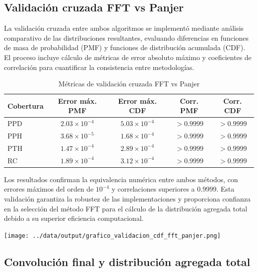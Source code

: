 \subsection{Validación cruzada FFT vs Panjer}

La validación cruzada entre ambos algoritmos se implementó mediante análisis comparativo de las distribuciones resultantes, evaluando diferencias en funciones de masa de probabilidad (PMF) y funciones de distribución acumulada (CDF). El proceso incluye cálculo de métricas de error absoluto máximo y coeficientes de correlación para cuantificar la consistencia entre metodologías.

\begin{table}[H]
\centering
\caption{Métricas de validación cruzada FFT vs Panjer}
\begin{tabular}{lcccc}
\hline
\textbf{Cobertura} & \textbf{Error máx. PMF} & \textbf{Error máx. CDF} & \textbf{Corr. PMF} & \textbf{Corr. CDF} \\
\hline
PPD & $2.03 \times 10^{-4}$ & $5.03 \times 10^{-4}$ & $>0.9999$ & $>0.9999$ \\
PPH & $3.68 \times 10^{-5}$ & $1.68 \times 10^{-4}$ & $>0.9999$ & $>0.9999$ \\
PTH & $1.47 \times 10^{-4}$ & $2.89 \times 10^{-4}$ & $>0.9999$ & $>0.9999$ \\
RC & $1.89 \times 10^{-4}$ & $3.12 \times 10^{-4}$ & $>0.9999$ & $>0.9999$ \\
\hline
\end{tabular}
\end{table}

\begin{minipage}[T][4cm]{0.42\textwidth}
Los resultados confirman la equivalencia numérica entre ambos métodos, con errores máximos del orden de $10^{-4}$ y correlaciones superiores a 0.9999. Esta validación garantiza la robustez de las implementaciones y proporciona confianza en la selección del método FFT para el cálculo de la distribución agregada total debido a su superior eficiencia computacional.
\end{minipage}
\hfill
\begin{minipage}[B]{0.53\textwidth}
\centering
\texttt{[image: ../data/output/grafico\_validacion\_cdf\_fft\_panjer.png]}
\end{minipage}

\subsection{Convolución final y distribución agregada total}

